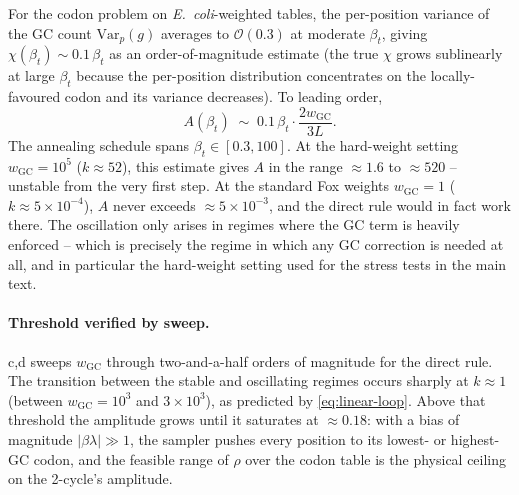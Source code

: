 \documentclass[11pt]{article}
\begin{document}
For the codon problem on \emph{E.\ coli}-weighted tables, the per-position variance of the GC count $\mathrm{Var}_p(g)$ averages to $\mathcal O(0.3)$ at moderate $\beta_t$, giving $\chi(\beta_t) \sim 0.1\,\beta_t$ as an order-of-magnitude estimate (the true $\chi$ grows sublinearly at large $\beta_t$ because the per-position distribution concentrates on the locally-favoured codon and its variance decreases).
To leading order,
\begin{equation}\label{eq:A-estimate}
  A(\beta_t) \;\sim\; 0.1\,\beta_t \cdot \frac{2 w_{\mathrm{GC}}}{3L}.
\end{equation}
The annealing schedule spans $\beta_t \in [0.3, 100]$.
At the hard-weight setting $w_{\mathrm{GC}} = 10^5$ ($k \approx 52$), this estimate gives $A$ in the range $\approx 1.6$ to $\approx 520$ -- unstable from the very first step.
At the standard Fox weights $w_{\mathrm{GC}} = 1$ ($k \approx 5\!\times\!10^{-4}$), $A$ never exceeds $\approx 5\!\times\!10^{-3}$, and the direct rule would in fact work there.
The oscillation only arises in regimes where the GC term is heavily enforced -- which is precisely the regime in which any GC correction is needed at all, and in particular the hard-weight setting used for the stress tests in the main text.

\paragraph{Threshold verified by sweep.}
c,d sweeps $w_{\mathrm{GC}}$ through two-and-a-half orders of magnitude for the direct rule.
The transition between the stable and oscillating regimes occurs sharply at $k \approx 1$ (between $w_{\mathrm{GC}} = 10^3$ and $3\!\times\!10^3$), as predicted by \cref{eq:linear-loop}. Above that threshold the amplitude grows until it saturates at $\approx 0.18$: with a bias of magnitude $|\beta \lambda| \gg 1$, the sampler pushes every position to its lowest- or highest-GC codon, and the feasible range of $\rho$ over the codon table is the physical ceiling on the 2-cycle's amplitude.
\end{document}
